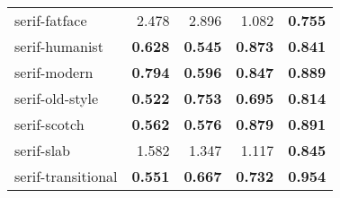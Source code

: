 \begin{longtable}{|l|r|r|r|r|}
serif-fatface             & 2.478          & 2.896          & 1.082          & \textbf{0.755} \\
serif-humanist            & \textbf{0.628} & \textbf{0.545} & \textbf{0.873} & \textbf{0.841} \\
serif-modern              & \textbf{0.794} & \textbf{0.596} & \textbf{0.847} & \textbf{0.889} \\
serif-old-style           & \textbf{0.522} & \textbf{0.753} & \textbf{0.695} & \textbf{0.814} \\
serif-scotch              & \textbf{0.562} & \textbf{0.576} & \textbf{0.879} & \textbf{0.891} \\
serif-slab                & 1.582          & 1.347          & 1.117          & \textbf{0.845} \\
serif-transitional        & \textbf{0.551} & \textbf{0.667} & \textbf{0.732} & \textbf{0.954}

\end{longtable}


